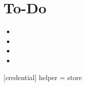 \chapter{To-Do}

\begin{itemize}
\item 
\item
\item
\item

\end{itemize}

[credential]
	helper = store